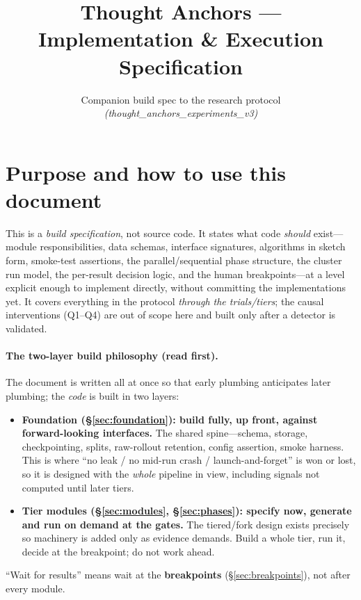 \documentclass[11pt]{article}
\title{\textbf{Thought Anchors --- Implementation \& Execution Specification}}
\author{Companion build spec to the research protocol\\ \emph{(thought\_anchors\_experiments\_v3)}}
\date{}
\begin{document}
\maketitle
\vspace{-2em}

\section{Purpose and how to use this document}
This is a \emph{build specification}, not source code. It states what code \emph{should} exist---module
responsibilities, data schemas, interface signatures, algorithms in sketch form, smoke-test assertions,
the parallel/sequential phase structure, the cluster run model, the per-result decision logic, and the
human breakpoints---at a level explicit enough to implement directly, without committing the
implementations yet. It covers everything in the protocol \emph{through the trials/tiers}; the causal
interventions (Q1--Q4) are out of scope here and built only after a detector is validated.

\paragraph{The two-layer build philosophy (read first).} The document is written all at once so that
early plumbing anticipates later plumbing; the \emph{code} is built in two layers:
\begin{itemize}
\item \textbf{Foundation (\S\ref{sec:foundation}): build fully, up front, against forward-looking
interfaces.} The shared spine---schema, storage, checkpointing, splits, raw-rollout retention,
config assertion, smoke harness. This is where ``no leak / no mid-run crash / launch-and-forget'' is
won or lost, so it is designed with the \emph{whole} pipeline in view, including signals not computed
until later tiers.
\item \textbf{Tier modules (\S\ref{sec:modules}, \S\ref{sec:phases}): specify now, generate and run on
demand at the gates.} The tiered/fork design exists precisely so machinery is added only as evidence
demands. Build a whole tier, run it, decide at the breakpoint; do not work ahead.
\end{itemize}
``Wait for results'' means wait at the \textbf{breakpoints} (\S\ref{sec:breakpoints}), not after every
module.
\end{document}
